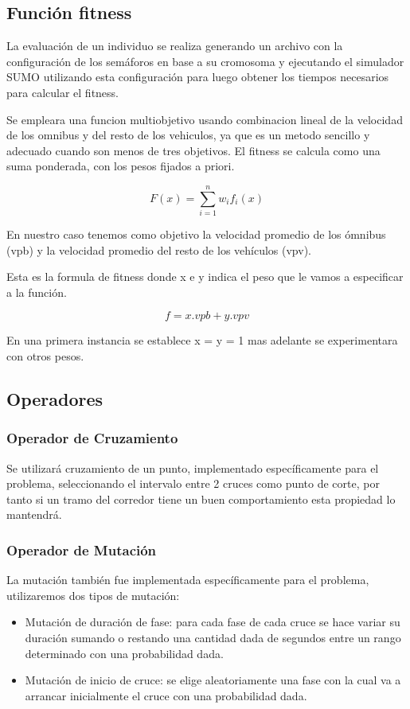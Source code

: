 \subsection{Función fitness}
La evaluación de un individuo se realiza generando un archivo con la configuración de los semáforos en base a su cromosoma y ejecutando el simulador SUMO utilizando esta configuración para luego obtener los tiempos necesarios para calcular el fitness.

Se empleara una funcion multiobjetivo usando combinacion lineal de la velocidad de los omnibus y del resto de los vehiculos, ya que es un metodo sencillo y adecuado cuando son menos de tres objetivos. El fitness se calcula como una suma ponderada, con los pesos fijados a priori.

        \begin{equation}
        \label{eq:funcion_fitness_generica}
		F(x) = \sum_{i=1}^{n}{w_i}{f_i}(x)
        \end{equation}

En nuestro caso tenemos como objetivo la velocidad promedio de los ómnibus (vpb) y la velocidad promedio del resto de los vehículos (vpv).

Esta es la formula de fitness donde x e y indica el peso que le vamos a especificar a la función. 

        \begin{equation}
        \label{eq:funcion_fitness}
        f = x.vpb + y.vpv
        \end{equation}
        
En una primera instancia se establece x = y = 1 mas adelante se experimentara con otros pesos.

\subsection{Operadores}
\subsubsection{Operador de Cruzamiento}
Se  utilizará cruzamiento  de  un  punto,  implementado
específicamente  para  el  problema,  seleccionando  el  intervalo
entre 2 cruces como punto de corte, por tanto si un tramo del corredor tiene un buen comportamiento esta propiedad lo mantendrá.


\subsubsection{Operador de Mutación}
La  mutación también fue  implementada  específicamente para
el problema, utilizaremos dos tipos de mutación:
\begin{itemize}

\item Mutación de duración de fase: para cada fase de cada cruce se
hace variar su duración sumando o restando una cantidad dada
de segundos entre un rango determinado con una probabilidad
dada.
\item Mutación de inicio de cruce: se elige aleatoriamente una fase
con  la  cual  va  a  arrancar  inicialmente  el  cruce  con  una
probabilidad dada.

\end{itemize}

